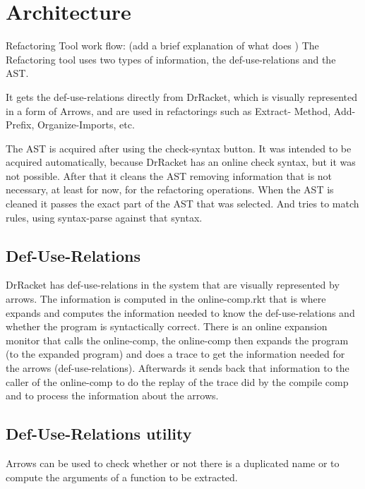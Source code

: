 
\section{Architecture}
Refactoring Tool work flow: (add a brief explanation of what does )
The Refactoring tool uses two types of information, the def-use-relations and
the AST.

It gets the def-use-relations directly from DrRacket, which is visually
represented in a form of Arrows, and are used in refactorings such as Extract-
Method, Add-Prefix, Organize-Imports, etc.

The AST is acquired after using the check-syntax button. It was intended to be
acquired automatically, because DrRacket has an online check syntax, but it was
not possible. After that it cleans the AST removing information that is not
necessary, at least for now, for the refactoring operations. When the AST is cleaned it
passes the exact part of the AST that was selected. And tries to match rules,
using syntax-parse against that syntax.

\subsection{Def-Use-Relations}
DrRacket has def-use-relations in the system that are visually represented by
arrows. The information is computed in the online-comp.rkt that is where expands
and computes the information needed to know the def-use-relations and whether
the program is syntactically correct.
There is an online expansion monitor that calls the online-comp, the online-comp
then expands the program (to the expanded program) and does a trace to get the
information needed for the arrows (def-use-relations).
Afterwards it sends back that information to the caller of the online-comp to do
the replay of the trace did by the compile comp and to process the information
about the arrows.


\subsection{Def-Use-Relations utility}
Arrows can be used to check whether or not there is a duplicated name or to
compute the arguments of a function to be extracted.

